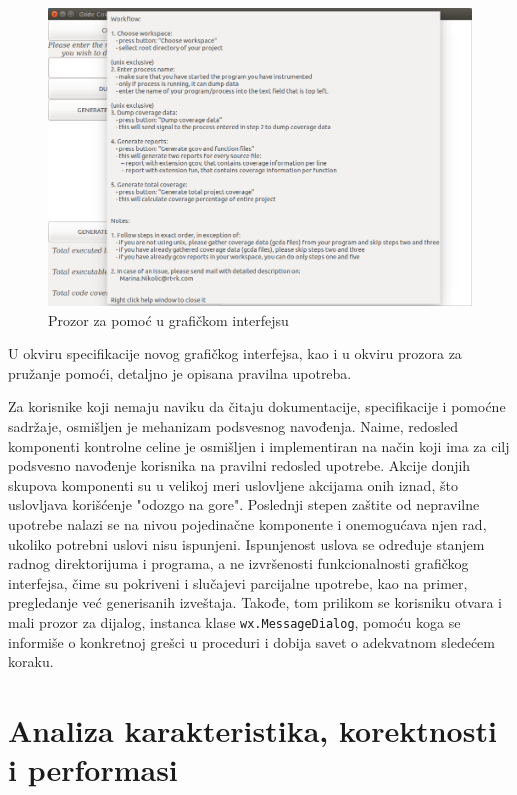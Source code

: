 \documentclass[12pt,oneside]{memoir}
\newcommand{\kod}[1]{\texttt{#1}}
\begin{document}
\begin{figure}[!ht]
  \centering
  \includegraphics[width=\textwidth]{img/GUI_4_ng.png}
  \caption{Prozor za pomoć u grafičkom interfejsu}
  \label{fig:GUI4}
\end{figure}
 
U okviru specifikacije novog grafičkog interfejsa, kao i u okviru prozora za pružanje pomoći, detaljno je opisana pravilna upotreba. 

Za korisnike koji nemaju naviku da čitaju dokumentacije, specifikacije i pomoćne sadržaje, osmišljen je mehanizam podsvesnog navođenja. Naime, redosled komponenti kontrolne celine je osmišljen i implementiran na način koji ima za cilj podsvesno navođenje korisnika na pravilni redosled upotrebe. Akcije donjih skupova komponenti su u velikoj meri uslovljene akcijama onih iznad, što uslovljava korišćenje "odozgo na gore". Poslednji stepen zaštite od nepravilne upotrebe nalazi se na nivou pojedinačne komponente i onemogućava njen rad, ukoliko potrebni uslovi nisu ispunjeni. Ispunjenost uslova se određuje stanjem radnog direktorijuma i programa, a ne izvršenosti funkcionalnosti grafičkog interfejsa, čime su pokriveni i slučajevi parcijalne upotrebe, kao na primer, pregledanje već generisanih izveštaja. Takođe, tom prilikom se korisniku otvara i mali prozor za dijalog, instanca klase \kod{wx.MessageDialog}, pomoću koga se informiše o konkretnoj grešci u proceduri i dobija savet o adekvatnom sledećem koraku.


\chapter{Analiza karakteristika, korektnosti i performasi}
\label{chp:testiranje}
\end{document}
